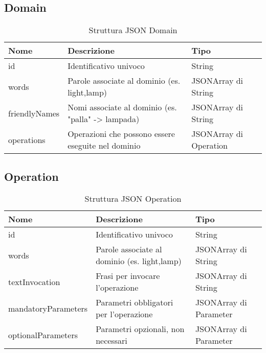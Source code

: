 \documentclass[twoside]{supsistudent}
\begin{document}
\subsection{Domain}
\begin{table}[H]
\centering
\caption{Struttura JSON Domain}
\label{Struttura JSON Domain}
\begin{tabular}{@{}|l|l|l|@{}}
\toprule
Nome          & Descrizione                                                                   & Tipo                   \\ \midrule
id            & Identificativo univoco                                                        & String                 \\ \midrule
words         & Parole associate al dominio (es. light,lamp)                         & JSONArray di String    \\ \midrule
friendlyNames & Nomi associate al dominio (es. "palla" -> lampada) & JSONArray di String    \\ \midrule
operations    & Operazioni che possono essere eseguite nel dominio                   & JSONArray di Operation \\ \bottomrule
\end{tabular}
\end{table}

\subsection{Operation}
\begin{table}[H]
\centering
\caption{Struttura JSON Operation}
\label{Struttura JSON Operation}
\begin{tabular}{@{}|l|l|l|@{}}
\toprule
Nome                & Descrizione                                                               & Tipo                   \\ \midrule
id                  & Identificativo univoco                                                    & String                 \\ \midrule
words               & Parole associate al dominio (es. light,lamp)                     & JSONArray di String    \\ \midrule
textInvocation      & Frasi per invocare l'operazione         & JSONArray di String    \\ \midrule
mandatoryParameters & Parametri obbligatori per l'operazione     & JSONArray di Parameter \\ \midrule
optionalParameters  & Parametri opzionali, non necessari & JSONArray di Parameter \\ \bottomrule
\end{tabular}
\end{table}
\end{document}
